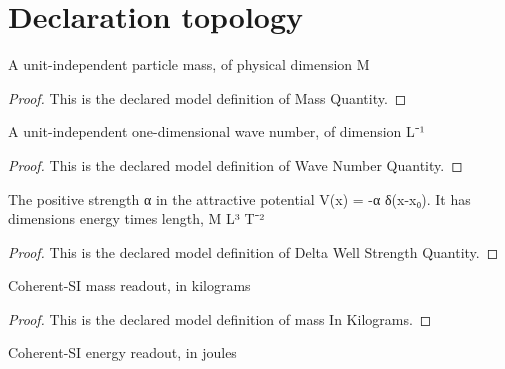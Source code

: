 \section{Declaration topology}
\begin{definition}
  \label{def:physics:phyx-mini-0601:phyxminiproblems-problemphyxmini0601-massquantity}
  A unit-independent particle mass, of physical dimension M
\end{definition}
\begin{proof}
  This is the declared model definition of Mass Quantity.
\end{proof}
\begin{definition}
  \label{def:physics:phyx-mini-0601:phyxminiproblems-problemphyxmini0601-wavenumberquantity}
  A unit-independent one-dimensional wave number, of dimension L⁻¹
\end{definition}
\begin{proof}
  This is the declared model definition of Wave Number Quantity.
\end{proof}
\begin{definition}
  \label{def:physics:phyx-mini-0601:phyxminiproblems-problemphyxmini0601-deltawellstrengthquantity}
  The positive strength α in the attractive potential V(x) = -α δ(x-x₀). It has dimensions energy times length, M L³ T⁻²
\end{definition}
\begin{proof}
  This is the declared model definition of Delta Well Strength Quantity.
\end{proof}
\begin{definition}
  \label{def:physics:phyx-mini-0601:phyxminiproblems-problemphyxmini0601-massinkilograms}
  Coherent-SI mass readout, in kilograms
\end{definition}
\begin{proof}
  This is the declared model definition of mass In Kilograms.
\end{proof}
\begin{definition}
  \label{def:physics:phyx-mini-0601:phyxminiproblems-problemphyxmini0601-energyinjoules}
  Coherent-SI energy readout, in joules
\end{definition}

